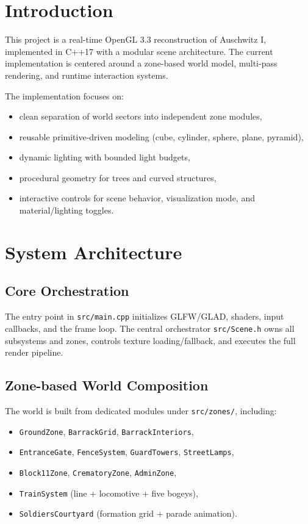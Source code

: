 \documentclass{article}
\begin{document}
\section{Introduction}
This project is a real-time OpenGL 3.3 reconstruction of Auschwitz I, implemented in C++17 with a modular scene architecture. The current implementation is centered around a zone-based world model, multi-pass rendering, and runtime interaction systems.

The implementation focuses on:
\begin{itemize}
    \item clean separation of world sectors into independent zone modules,
    \item reusable primitive-driven modeling (cube, cylinder, sphere, plane, pyramid),
    \item dynamic lighting with bounded light budgets,
    \item procedural geometry for trees and curved structures,
    \item interactive controls for scene behavior, visualization mode, and material/lighting toggles.
\end{itemize}

\section{System Architecture}
\subsection{Core Orchestration}
The entry point in \texttt{src/main.cpp} initializes GLFW/GLAD, shaders, input callbacks, and the frame loop. The central orchestrator \texttt{src/Scene.h} owns all subsystems and zones, controls texture loading/fallback, and executes the full render pipeline.

\subsection{Zone-based World Composition}
The world is built from dedicated modules under \texttt{src/zones/}, including:
\begin{itemize}
    \item \texttt{GroundZone}, \texttt{BarrackGrid}, \texttt{BarrackInteriors},
    \item \texttt{EntranceGate}, \texttt{FenceSystem}, \texttt{GuardTowers}, \texttt{StreetLamps},
    \item \texttt{Block11Zone}, \texttt{CrematoryZone}, \texttt{AdminZone},
    \item \texttt{TrainSystem} (line + locomotive + five bogeys),
    \item \texttt{SoldiersCourtyard} (formation grid + parade animation).
\end{itemize}
\end{document}
